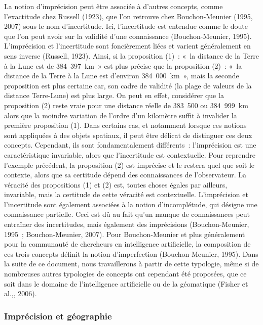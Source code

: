 La notion d’imprécision peut être associée à d’autres concepts, comme
l’exactitude chez Russell (1923), que l’on retrouve chez
Bouchon-Meunier (1995, 2007) sous le nom d’incertitude. Ici,
l’incertitude est entendue comme le doute que l’on peut avoir sur la
validité d’une connaissance (Bouchon-Meunier, 1995). L’imprécision et
l’incertitude sont foncièrement liées et varient généralement en sens
inverse (Russell, 1923). Ainsi, si la proposition (1) : « la distance
de la Terre à la Lune est de 384 397 km » est plus précise que la
proposition (2) : « la distance de la Terre à la Lune est d’environ
384 000 km », mais la seconde proposition est plus certaine car, son
cadre de validité (la plage de valeurs de la distance Terre-Lune) est
plus large. On peut en effet, considérer que la proposition (2) reste
vraie pour une distance réelle de 383 500 ou 384 999 km alors que la
moindre variation de l’ordre d’un kilomètre suffit à invalider la
première proposition (1). Dans certains cas, et notamment lorsque ces
notions sont appliquées à des objets spatiaux, il peut être délicat de
distinguer ces deux concepts. Cependant, ils sont fondamentalement
différents : l’imprécision est une caractéristique invariable, alors
que l’incertitude est contextuelle. Pour reprendre l’exemple
précédent, la proposition (2) est imprécise et le restera quel que
soit le contexte, alors que sa certitude dépend des connaissances de
l’observateur. La véracité des propositions (1) et (2) est, toutes
choses égales par ailleurs, invariable, mais la certitude de cette
véracité est contextuelle.  L’imprécision et l’incertitude sont
également associées à la notion d’incomplétude, qui désigne une
connaissance partielle. Ceci est dû au fait qu’un manque de
connaissances peut entraîner des incertitudes, mais également des
imprécisions (Bouchon-Meunier, 1995 ; Bouchon-Meunier, 2007). Pour
Bouchon-Meunier et plus généralement pour la communauté de chercheurs
en intelligence artificielle, la composition de ces trois concepts
définit la notion d’imperfection (Bouchon-Meunier, 1995). Dans la
suite de ce document, nous travaillerons à partir de cette typologie,
même si de nombreuses autres typologies de concepts ont cependant été
proposées, que ce soit dans le domaine de l’intelligence artificielle
ou de la géomatique (Fisher et al.,, 2006).

\subsubsection{Imprécision et géographie}

